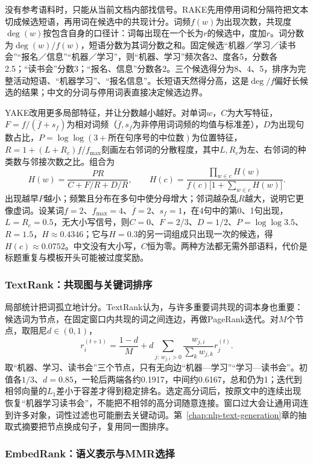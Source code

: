 没有参考语料时，只能从当前文档内部找信号。RAKE先用停用词和分隔符把文本切成候选短语，再用词在候选中的共现计分。词频$f(w)$为出现次数，共现度$\deg(w)$按包含自身的口径计：词每出现在一个长为$r$的候选中，度加$r$。词分数为$\deg(w)/f(w)$，短语分数为其词分数之和。固定候选“机器／学习／读书会”“报名／信息”“机器／学习”，则“机器、学习”频次各2、度各5，分数各2.5；“读书会”分数3；“报名、信息”分数各2。三个候选得分为8、4、5，排序为完整活动短语、“机器学习”、“报名信息”。长短语天然得分高，这是$\deg/f$偏好长候选的结果；中文的分词与停用词表直接决定候选边界。

YAKE改用更多局部特征，并让分数越小越好。对单词$w$，$C$为大写特征，$F=f/(\overline f+s_f)$为相对词频（$\overline f,s_f$为非停用词词频的均值与标准差），$D$为出现句数占比，$P=\log\log(3+\text{所在句序号的中位数})$为位置特征，$R=1+(L+R_{\!c})f/f_{\max}$刻画左右邻词的分散程度，其中$L,R_{\!c}$为左、右邻词的种类数与邻接次数之比。组合为
\[
 H(w)=\frac{PR}{C+F/R+D/R},\qquad
 H(c)=\frac{\prod_{w\in c}H(w)}{f(c)\bigl[1+\sum_{w\in c}H(w)\bigr]}.
\]
出现越早$P$越小；频繁且分布在多句中使分母增大；邻词越杂乱$R$越大，说明它更像虚词。设某词$f=2$、$f_{\max}=4$、$\overline f=2$、$s_f=1$，在4句中的第0、1句出现，$L=R_{\!c}=0.5$，无大小写信号，则$C=0$、$F=2/3$、$D=1/2$、$P=\log\log3.5$、$R=1.5$，$H\approx0.4346$；它与$H=0.3$的另一词组成只出现一次的候选，得$H(c)\approx0.0752$。中文没有大小写，$C$恒为零。两种方法都无需外部语料，代价是标题重复与模板开头可能被过度奖励。

\subsubsection{TextRank：共现图与关键词排序}
\label{sec:nlp-classification-textrank}

局部统计把词孤立地计分。TextRank认为，与许多重要词共现的词本身也重要：候选词为节点，在固定窗口内共现的词之间连边，再做PageRank迭代。对$M$个节点，取阻尼$d\in(0,1)$，
\[
 r_i^{(t+1)}=\frac{1-d}{M}+d\sum_{j:\,w_{j,i}>0}\frac{w_{j,i}}{\sum_kw_{j,k}}r_j^{(t)}.
\]
取“机器、学习、读书会”三个节点，只有无向边“机器—学习”“学习—读书会”。初值各$1/3$、$d=0.85$，一轮后两端各约0.1917，中间约0.6167，总和仍为1；迭代到相邻向量的$L_1$差小于容差才得到稳定排名。选定高分词后，按原文中的连续出现恢复“机器学习读书会”，不能把不相邻的高分词随意连接。窗口过大会让通用词连到许多对象，词性过滤也可能删去关键动词。第~\ref{chap:nlp-text-generation}章的抽取式摘要把节点换成句子，复用同一图排序。

\subsubsection{EmbedRank：语义表示与MMR选择}
\label{sec:nlp-classification-embedrank}

